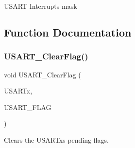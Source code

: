 U\+S\+A\+RT Interrupts mask 

\subsection{Function Documentation}
\mbox{\label{group___u_s_a_r_t_gad962e148fc466ae1b45b288f6c91d966}} 
\subsubsection{\texorpdfstring{U\+S\+A\+R\+T\+\_\+\+Clear\+Flag()}{USART\_ClearFlag()}}
{\footnotesize\ttfamily void U\+S\+A\+R\+T\+\_\+\+Clear\+Flag (\begin{DoxyParamCaption}\item[{U\+S\+A\+R\+T\+\_\+\+Type\+Def $\ast$}]{U\+S\+A\+R\+Tx,  }\item[{uint16\+\_\+t}]{U\+S\+A\+R\+T\+\_\+\+F\+L\+AG }\end{DoxyParamCaption})}



Clears the U\+S\+A\+R\+Tx\textquotesingle{}s pending flags. 


